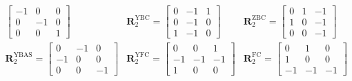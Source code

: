 \documentclass{article}      %
\begin{document}
\begin{displaymath}
\begin{matrix}
\begin{bmatrix}
		-1 & 0 & 0\\
		0 & -1 & 0\\
		0 & 0 & 1
	\end{bmatrix}&\mathbf{R}_2^\mathrm{YBC}=
	\begin{bmatrix}
		0 & -1 & 1\\
		0 & -1 & 0\\
		1 & -1 & 0
	\end{bmatrix}&\mathbf{R}_2^\mathrm{ZBC}=
	\begin{bmatrix}
		0 & 1 & -1\\
		1 & 0 & -1\\
		0 & 0 & -1
	\end{bmatrix}\\\mathbf{R}_2^\mathrm{YBAS}=
	\begin{bmatrix}
		0 & -1 & 0\\
		-1 & 0 & 0\\
		0 & 0 & -1
	\end{bmatrix}&\mathbf{R}_2^\mathrm{YFC}=
	\begin{bmatrix}
		0 & 0 & 1\\
		-1 & -1 & -1\\
		1 & 0 & 0
	\end{bmatrix} &\mathbf{R}_2^\mathrm{FC}=
	\begin{bmatrix}
		0 & 1 & 0\\
		1 & 0 & 0\\
		-1 & -1 & -1
	\end{bmatrix}
	\end{matrix}
\end{displaymath}
\end{document}
